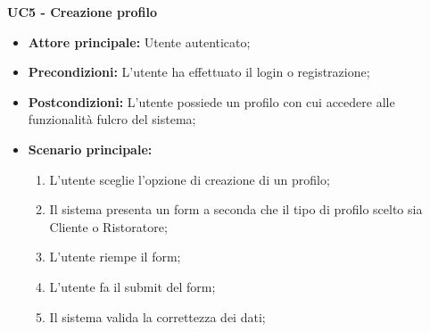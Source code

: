 \textbf{UC5 - Creazione profilo}
\begin{itemize}
    \item \textbf{Attore principale: }Utente autenticato;
    \item \textbf{Precondizioni: }L'utente ha effettuato il login o registrazione;
    \item \textbf{Postcondizioni: }L'utente possiede un profilo con cui accedere alle funzionalità fulcro del sistema;
    \item \textbf{Scenario principale:} 
        \begin{enumerate}
            \item L'utente sceglie l'opzione di creazione di un profilo;
            \item Il sistema presenta un form a seconda che il tipo di profilo scelto sia Cliente o Ristoratore;
            \item L'utente riempe il form;
            \item L'utente fa il submit del form;
            \item Il sistema valida la correttezza dei dati;
        \end{enumerate}
\end{itemize}
